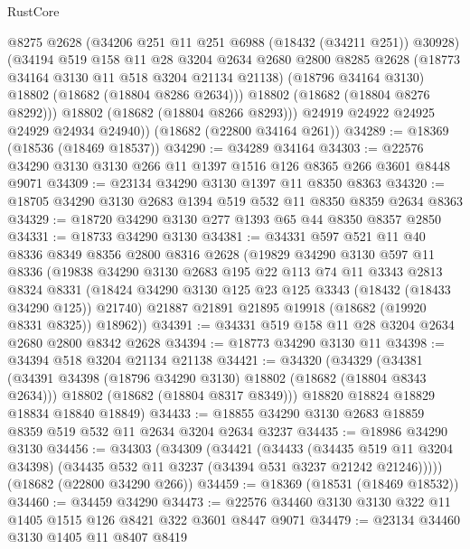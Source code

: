 \begin{lexlean}{RustCore}
\begin{coremodule}
            @8275
            @2628
            (@34206 @251 @11 @251 @6988 (@18432 (@34211 @251)) @30928)
            (@34194
              @519
              @158
              @11
              @28
              @3204
              @2634
              @2680
              @2800
              @8285
              @2628
              (@18773 @34164 @3130 @11 @518 @3204 @21134 @21138)
              (@18796 @34164 @3130)
              @18802
              (@18682 (@18804 @8286 @2634)))
            @18802
            (@18682 (@18804 @8276 @8292)))
          @18802
          (@18682 (@18804 @8266 @8293)))
        @24919
        @24922
        @24925
        @24929
        @24934
        @24940))
    (@18682 (@22800 @34164 @261))
@34289 := @18369 (@18536 (@18469 @18537))
@34290 := @34289 @34164
@34303 := @22576 @34290 @3130 @3130 @266 @11 @1397 @1516 @126 @8365 @266 @3601 @8448 @9071
@34309 := @23134 @34290 @3130 @1397 @11 @8350 @8363
@34320 := @18705 @34290 @3130 @2683 @1394 @519 @532 @11 @8350 @8359 @2634 @8363
@34329 := @18720 @34290 @3130 @277 @1393 @65 @44 @8350 @8357 @2850
@34331 := @18733 @34290 @3130
@34381 := @34331
    @597
    @521
    @11
    @40
    @8336
    @8349
    @8356
    @2800
    @8316
    @2628
    (@19829
      @34290
      @3130
      @597
      @11
      @8336
      (@19838
        @34290
        @3130
        @2683
        @195
        @22
        @113
        @74
        @11
        @3343
        @2813
        @8324
        @8331
        (@18424 @34290 @3130 @125 @23 @125 @3343 (@18432 (@18433 @34290 @125)) @21740)
        @21887
        @21891
        @21895
        @19918
        (@18682 (@19920 @8331 @8325))
        @18962))
@34391 := @34331 @519 @158 @11 @28 @3204 @2634 @2680 @2800 @8342 @2628
@34394 := @18773 @34290 @3130 @11
@34398 := @34394 @518 @3204 @21134 @21138
@34421 := @34320
    (@34329
      (@34381
        (@34391 @34398 (@18796 @34290 @3130) @18802 (@18682 (@18804 @8343 @2634)))
        @18802
        (@18682 (@18804 @8317 @8349)))
      @18820
      @18824
      @18829
      @18834
      @18840
      @18849)
@34433 := @18855 @34290 @3130 @2683 @18859 @8359 @519 @532 @11 @2634 @3204 @2634 @3237
@34435 := @18986 @34290 @3130
@34456 := @34303
    (@34309
      (@34421
        (@34433
          (@34435 @519 @11 @3204 @34398)
          (@34435 @532 @11 @3237 (@34394 @531 @3237 @21242 @21246)))))
    (@18682 (@22800 @34290 @266))
@34459 := @18369 (@18531 (@18469 @18532))
@34460 := @34459 @34290
@34473 := @22576 @34460 @3130 @3130 @322 @11 @1405 @1515 @126 @8421 @322 @3601 @8447 @9071
@34479 := @23134 @34460 @3130 @1405 @11 @8407 @8419

\end{coremodule}
\end{lexlean}
